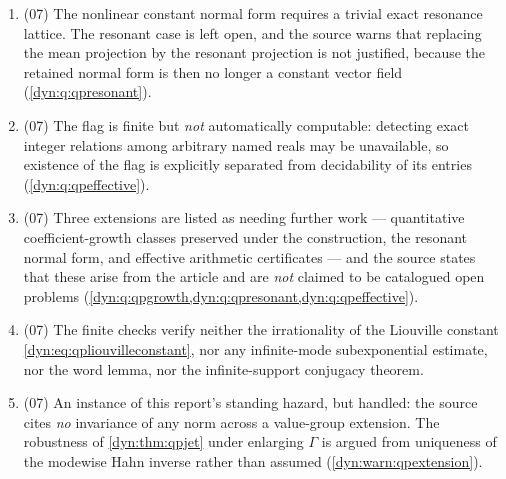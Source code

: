 \documentclass[11pt,letterpaper]{article}
\theoremstyle{definition}
\theoremstyle{remark}
\newcommand{\No}{\mathbf{No}}
\numberwithin{equation}{section}
\begin{document}
\begin{enumerate}[label=\textbf{N\arabic*.},leftmargin=3.2em,start=71]
\cref{dyn:thm:qpdensity} is coefficientwise integration of analytic
functions --- \textbf{not} a countably additive $\No$-valued measure on
arbitrary subsets and \textbf{not} a real-time ergodic theorem. The report
 shows that in the
strong sense no invariant probability exists for an ordinary action all of
whose orbits are infinite (\texttt{meas:thm:orbits}), and discusses this
density there (\texttt{meas:rem:dynamics}).
\item (07) The nonlinear constant normal form requires a trivial exact
resonance lattice. The resonant case is left open, and the source warns
that replacing the mean projection by the resonant projection is not
justified, because the retained normal form is then no longer a constant
vector field (\cref{dyn:q:qpresonant}).
\item (07) The flag is finite but \emph{not} automatically computable:
detecting exact integer relations among arbitrary named reals may be
unavailable, so existence of the flag is explicitly separated from
decidability of its entries (\cref{dyn:q:qpeffective}).
\item (07) Three extensions are listed as needing further work ---
quantitative coefficient-growth classes preserved under the construction,
the resonant normal form, and effective arithmetic certificates --- and the
source states that these arise from the article and are \emph{not} claimed
to be catalogued open problems
(\cref{dyn:q:qpgrowth,dyn:q:qpresonant,dyn:q:qpeffective}).
\item (07) The finite checks verify neither the irrationality of the
Liouville constant \eqref{dyn:eq:qpliouvilleconstant}, nor any infinite-mode
subexponential estimate, nor the word lemma, nor the infinite-support
conjugacy theorem.
\item (07) An instance of this report's standing hazard, but handled: the
source cites \emph{no} invariance of any norm across a value-group
extension. The robustness of \cref{dyn:thm:qpjet} under enlarging $\Gamma$
is argued from uniqueness of the modewise Hahn inverse rather than assumed
(\cref{dyn:warn:qpextension}).
\end{enumerate}
\end{document}
